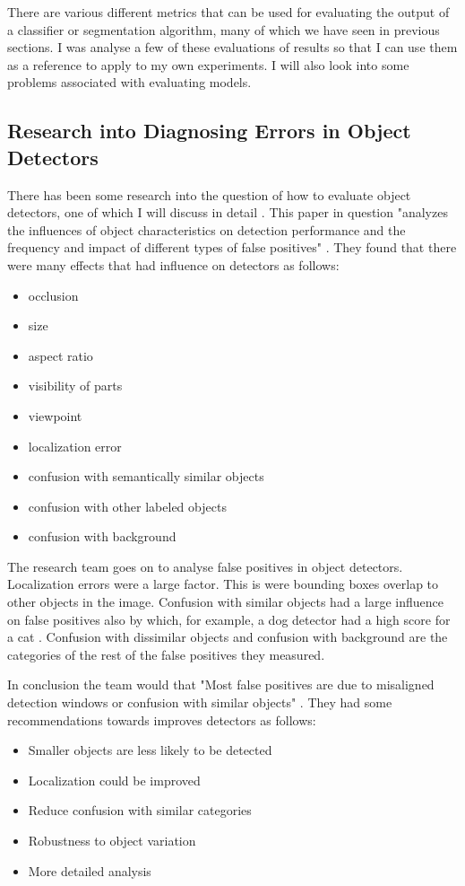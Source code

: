 There are various different metrics that can be used for evaluating the output
of a classifier or segmentation algorithm, many of which we have seen in previous
sections. I was analyse a few of these evaluations of results so that I can use
them as a reference to apply to my own experiments. I will also look into some
problems associated with evaluating models.

\subsection{Research into Diagnosing Errors in Object Detectors}
There has been some research into the question of how to evaluate object
detectors, one of which I will discuss in detail \textcite{diagnosingErrors}.
This paper in question "analyzes the influences of object characteristics on
detection performance and the frequency and impact of different types of false
positives" \textcite{diagnosingErrors}. They found that there were many effects
that had influence on detectors as follows:
\begin{itemize}
    \item{occlusion}
    \item{size}
    \item{aspect ratio}
    \item{visibility of parts}
    \item{viewpoint}
    \item{localization error}
    \item{confusion with semantically similar objects}
    \item{confusion with other labeled objects}
    \item{confusion with background}
\end{itemize}

The research team goes on to analyse false positives in object detectors.
Localization errors were a large factor. This is were bounding boxes overlap to
other objects in the image. Confusion with similar objects had a large influence
on false positives also by which, for example, a dog detector had a high score
for a cat \textcite{diagnosingErrors}. Confusion with dissimilar objects and
confusion with background are the categories of the rest of the false positives
they measured.

In conclusion the team would that "Most false positives are due to misaligned
detection windows or confusion with similar objects"
\textcite{diagnosingErrors}. They had some recommendations towards improves
detectors as follows:
\begin{itemize}
	\item{Smaller objects are less likely to be detected}
	\item{Localization could be improved}
	\item{Reduce confusion with similar categories}
	\item{Robustness to object variation}
	\item{More detailed analysis}
\end{itemize}

